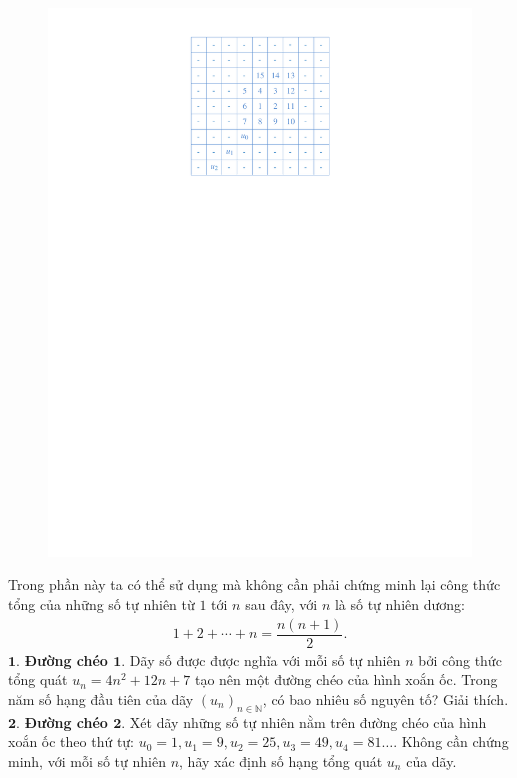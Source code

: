 \begin{multicols}{2}
\begin{figure}[H]
		\vspace*{-5pt}
		\centering
		\captionsetup{labelformat= empty, justification=centering}
		\includegraphics[scale=0.7]{table}
		\vspace*{-12pt}
	\end{figure}	
	Trong phần này ta có thể sử dụng mà không cần phải chứng minh lại công thức tổng của những số tự nhiên từ $1$ tới $n$ sau đây, với $n$ là số tự nhiên dương: 
	\begin{align*}
		1+2+\cdots +n=\dfrac{n(n+1)}{2}.
	\end{align*}
	$\pmb{1.}$  \textbf{\color{cackithi}Đường chéo $\pmb{1.}$}
	\vskip 0.05cm
	Dãy số được được nghĩa với mỗi số tự nhiên $n$ bởi công thức tổng quát $u_n=4n^2+12n+7$ tạo nên một đường chéo của hình xoắn ốc. Trong năm số hạng đầu tiên của dãy $(u_n )_{n \in \mathbb{N}}$, có bao nhiêu số nguyên tố? Giải thích.
	\vskip 0.05cm
	$\pmb{2.}$  \textbf{\color{cackithi}Đường chéo $\pmb{2.}$}
	\vskip 0.05cm
	Xét dãy những số tự nhiên nằm trên đường chéo của hình xoắn ốc theo thứ tự: $u_0=1,u_1=9,u_2=25,u_3=49,u_4=81\ldots$. Không cần chứng minh, với mỗi số tự nhiên $n$, hãy xác định số hạng tổng quát $u_n$ của dãy. 

\end{multicols}
